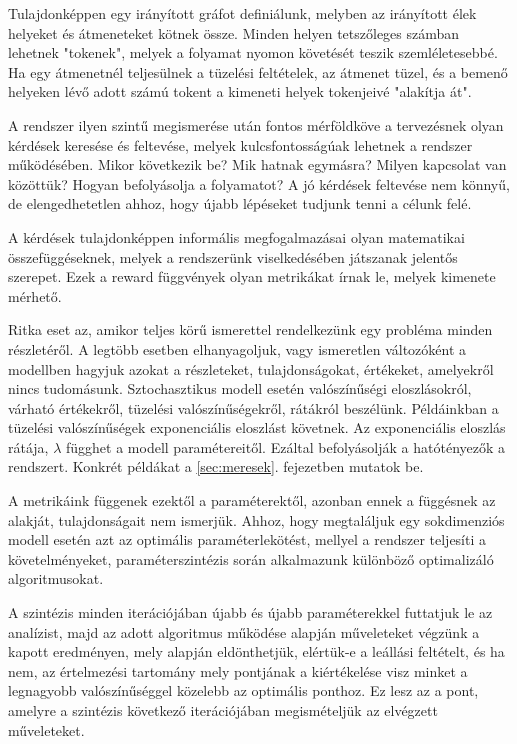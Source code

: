Tulajdonképpen egy irányított gráfot definiálunk, melyben az irányított élek helyeket és átmeneteket kötnek össze. Minden helyen tetszőleges számban lehetnek "tokenek", melyek a folyamat nyomon követését teszik szemléletesebbé. Ha egy átmenetnél teljesülnek a tüzelési feltételek, az átmenet tüzel, és a bemenő helyeken lévő adott számú tokent a kimeneti helyek tokenjeivé "alakítja át".

A rendszer ilyen szintű megismerése után fontos mérföldköve a tervezésnek olyan kérdések keresése és feltevése, melyek kulcsfontosságúak lehetnek a rendszer működésében. Mikor következik be? Mik hatnak egymásra? Milyen kapcsolat van közöttük? Hogyan befolyásolja a folyamatot? A jó kérdések feltevése nem könnyű, de elengedhetetlen ahhoz, hogy újabb lépéseket tudjunk tenni a célunk felé.

A kérdések tulajdonképpen informális megfogalmazásai olyan matematikai összefüggéseknek, melyek a rendszerünk viselkedésében játszanak jelentős szerepet. Ezek a reward függvények olyan metrikákat írnak le, melyek kimenete mérhető. 

Ritka eset az, amikor teljes körű ismerettel rendelkezünk egy probléma minden részletéről. A legtöbb esetben elhanyagoljuk, vagy ismeretlen változóként a modellben hagyjuk azokat a részleteket, tulajdonságokat, értékeket, amelyekről nincs tudomásunk. 
Sztochasztikus modell esetén valószínűségi eloszlásokról, várható értékekről, tüzelési valószínűségekről, rátákról beszélünk. Példáinkban a tüzelési valószínűségek exponenciális eloszlást követnek. Az exponenciális eloszlás rátája, $\lambda$
függhet a modell paramétereitől. Ezáltal befolyásolják a hatótényezők a rendszert. Konkrét példákat a \ref{sec:meresek}. fejezetben mutatok be.

A metrikáink függenek ezektől a paraméterektől, azonban ennek a függésnek az alakját, tulajdonságait nem ismerjük. Ahhoz, hogy megtaláljuk egy sokdimenziós modell esetén azt az optimális paraméterlekötést, mellyel a rendszer teljesíti a követelményeket, paraméterszintézis során alkalmazunk különböző optimalizáló algoritmusokat.

A szintézis minden iterációjában újabb és újabb paraméterekkel futtatjuk le az analízist, majd az adott algoritmus működése alapján műveleteket végzünk a kapott eredményen, mely alapján eldönthetjük, elértük-e a leállási feltételt, és ha nem, az értelmezési tartomány mely pontjának a kiértékelése visz minket a legnagyobb valószínűséggel közelebb az optimális ponthoz. Ez lesz az a pont, amelyre a szintézis következő iterációjában megismételjük az elvégzett műveleteket.

